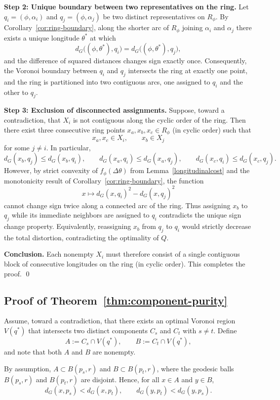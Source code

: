 \documentclass[12pt, reqno]{amsart}
\theoremstyle{plain}
\theoremstyle{definition}
\begin{document}
\medskip
\noindent\textbf{Step 2: Unique boundary between two representatives on the ring.}
Let $q_i=(\phi,\alpha_i)$ and $q_j=(\phi,\alpha_j)$ be two distinct representatives on $R_\phi$.
By Corollary~\ref{cor:ring-boundary}, along the shorter arc of $R_\phi$ joining $\alpha_i$ and $\alpha_j$
there exists a unique longitude $\theta^\ast$ at which
\[
d_G\big((\phi,\theta^\ast),q_i\big)=d_G\big((\phi,\theta^\ast),q_j\big),
\]
and the difference of squared distances changes sign exactly once.
Consequently, the Voronoi boundary between $q_i$ and $q_j$ intersects the ring at exactly one point, and the ring is partitioned into two contiguous arcs, one assigned to $q_i$ and the other to $q_j$.

\medskip
\noindent\textbf{Step 3: Exclusion of disconnected assignments.}
Suppose, toward a contradiction, that $X_i$ is not contiguous along the cyclic order of the ring.
Then there exist three consecutive ring points $x_a,x_b,x_c\in R_\phi$ (in cyclic order) such that
\[
x_a,x_c\in X_i,\qquad x_b\in X_j
\]
for some $j\neq i$.
In particular,
\[
d_G(x_b,q_j)\le d_G(x_b,q_i),
\qquad
d_G(x_a,q_i)\le d_G(x_a,q_j),
\qquad
d_G(x_c,q_i)\le d_G(x_c,q_j).
\]
However, by strict convexity of $f_\phi(\Delta\theta)$ from Lemma~\ref{longitudinalcost} and the monotonicity result of Corollary~\ref{cor:ring-boundary}, the function
\[
x\longmapsto d_G(x,q_i)^2-d_G(x,q_j)^2
\]
cannot change sign twice along a connected arc of the ring.
Thus assigning $x_b$ to $q_j$ while its immediate neighbors are assigned to $q_i$ contradicts the unique sign change property.
Equivalently, reassigning $x_b$ from $q_j$ to $q_i$ would strictly decrease the total distortion, contradicting the optimality of $Q$.

\medskip
\noindent\textbf{Conclusion.}
Each nonempty $X_i$ must therefore consist of a single contiguous block of consecutive longitudes on the ring (in cyclic order).
This completes the proof.
\qed 

\subsection*{Proof of Theorem~\ref{thm:component-purity}} 

Assume, toward a contradiction, that there exists an optimal Voronoi region
$V(q^*)$ that intersects two distinct components $C_s$ and $C_t$ with $s\neq t$.
Define
\[
A := C_s \cap V(q^*), \qquad B := C_t \cap V(q^*),
\]
and note that both $A$ and $B$ are nonempty.

By assumption, $A\subset B(p_s,r)$ and $B\subset B(p_t,r)$, where the geodesic
balls $B(p_s,r)$ and $B(p_t,r)$ are disjoint.
Hence, for all $x\in A$ and $y\in B$,
\[
d_G(x,p_s) < d_G(x,p_t), \qquad d_G(y,p_t) < d_G(y,p_s).
\]
\end{document}
